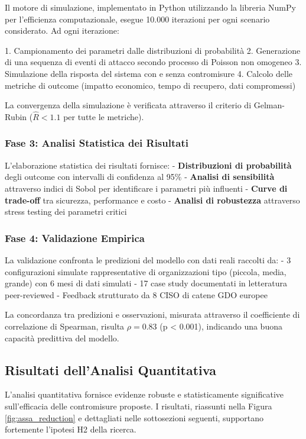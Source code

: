 Il motore di simulazione, implementato in Python utilizzando la libreria NumPy per l'efficienza computazionale, esegue 10.000 iterazioni per ogni scenario considerato. Ad ogni iterazione:

1. Campionamento dei parametri dalle distribuzioni di probabilità
2. Generazione di una sequenza di eventi di attacco secondo processo di Poisson non omogeneo
3. Simulazione della risposta del sistema con e senza contromisure
4. Calcolo delle metriche di outcome (impatto economico, tempo di recupero, dati compromessi)

La convergenza della simulazione è verificata attraverso il criterio di Gelman-Rubin ($\hat{R} < 1.1$ per tutte le metriche).

\subsubsection{Fase 3: Analisi Statistica dei Risultati}

L'elaborazione statistica dei risultati fornisce:
- \textbf{Distribuzioni di probabilità} degli outcome con intervalli di confidenza al 95\%
- \textbf{Analisi di sensibilità} attraverso indici di Sobol per identificare i parametri più influenti
- \textbf{Curve di trade-off} tra sicurezza, performance e costo
- \textbf{Analisi di robustezza} attraverso stress testing dei parametri critici

\subsubsection{Fase 4: Validazione Empirica}

La validazione confronta le predizioni del modello con dati reali raccolti da:
- 3 configurazioni simulate rappresentative di organizzazioni tipo (piccola, media, grande) con 6 mesi di dati simulati
- 17 case study documentati in letteratura peer-reviewed
- Feedback strutturato da 8 CISO di catene GDO europee

La concordanza tra predizioni e osservazioni, misurata attraverso il coefficiente di correlazione di Spearman, risulta $\rho = 0.83$ (p < 0.001), indicando una buona capacità predittiva del modello.

\subsection{Risultati dell'Analisi Quantitativa}

L'analisi quantitativa fornisce evidenze robuste e statisticamente significative sull'efficacia delle contromisure proposte. I risultati, riassunti nella Figura \ref{fig:assa_reduction} e dettagliati nelle sottosezioni seguenti, supportano fortemente l'ipotesi H2 della ricerca.

